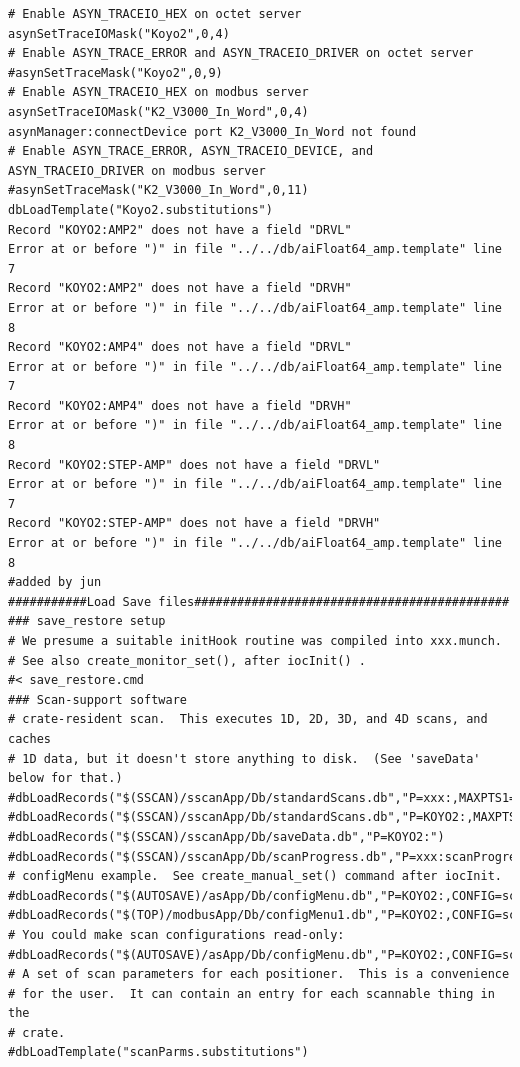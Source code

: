 \documentclass[11pt
  , a4paper
  , article
  , oneside
]{memoir}
\begin{document}
\begin{lstlisting}[style=termstyle]
# Enable ASYN_TRACEIO_HEX on octet server
asynSetTraceIOMask("Koyo2",0,4)
# Enable ASYN_TRACE_ERROR and ASYN_TRACEIO_DRIVER on octet server
#asynSetTraceMask("Koyo2",0,9)
# Enable ASYN_TRACEIO_HEX on modbus server
asynSetTraceIOMask("K2_V3000_In_Word",0,4)
asynManager:connectDevice port K2_V3000_In_Word not found
# Enable ASYN_TRACE_ERROR, ASYN_TRACEIO_DEVICE, and ASYN_TRACEIO_DRIVER on modbus server
#asynSetTraceMask("K2_V3000_In_Word",0,11)
dbLoadTemplate("Koyo2.substitutions")
Record "KOYO2:AMP2" does not have a field "DRVL"
Error at or before ")" in file "../../db/aiFloat64_amp.template" line 7
Record "KOYO2:AMP2" does not have a field "DRVH"
Error at or before ")" in file "../../db/aiFloat64_amp.template" line 8
Record "KOYO2:AMP4" does not have a field "DRVL"
Error at or before ")" in file "../../db/aiFloat64_amp.template" line 7
Record "KOYO2:AMP4" does not have a field "DRVH"
Error at or before ")" in file "../../db/aiFloat64_amp.template" line 8
Record "KOYO2:STEP-AMP" does not have a field "DRVL"
Error at or before ")" in file "../../db/aiFloat64_amp.template" line 7
Record "KOYO2:STEP-AMP" does not have a field "DRVH"
Error at or before ")" in file "../../db/aiFloat64_amp.template" line 8
#added by jun
###########Load Save files############################################
### save_restore setup
# We presume a suitable initHook routine was compiled into xxx.munch.
# See also create_monitor_set(), after iocInit() .
#< save_restore.cmd
### Scan-support software
# crate-resident scan.  This executes 1D, 2D, 3D, and 4D scans, and caches
# 1D data, but it doesn't store anything to disk.  (See 'saveData' below for that.)
#dbLoadRecords("$(SSCAN)/sscanApp/Db/standardScans.db","P=xxx:,MAXPTS1=1000,MAXPTS2=1000,MAXPTS3=1000,MAXPTS4=1000,MAXPTSH=1000")
#dbLoadRecords("$(SSCAN)/sscanApp/Db/standardScans.db","P=KOYO2:,MAXPTS1=1000,MAXPTS2=1000,MAXPTS3=1000,MAXPTS4=1000,MAXPTSH=1000")
#dbLoadRecords("$(SSCAN)/sscanApp/Db/saveData.db","P=KOYO2:")
#dbLoadRecords("$(SSCAN)/sscanApp/Db/scanProgress.db","P=xxx:scanProgress:")
# configMenu example.  See create_manual_set() command after iocInit.
#dbLoadRecords("$(AUTOSAVE)/asApp/Db/configMenu.db","P=KOYO2:,CONFIG=scan1")
#dbLoadRecords("$(TOP)/modbusApp/Db/configMenu1.db","P=KOYO2:,CONFIG=scan1")
# You could make scan configurations read-only:
#dbLoadRecords("$(AUTOSAVE)/asApp/Db/configMenu.db","P=KOYO2:,CONFIG=scan1,ENABLE_SAVE=0")
# A set of scan parameters for each positioner.  This is a convenience
# for the user.  It can contain an entry for each scannable thing in the
# crate.
#dbLoadTemplate("scanParms.substitutions")

\end{lstlisting}
\end{document}
